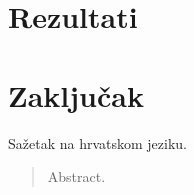 \documentclass[times, utf8, zavrsni]{fer}
\begin{document}
\chapter{Rezultati}


\chapter{Zaključak}





\begin{sazetak}
Sažetak na hrvatskom jeziku.

\end{sazetak}

\begin{abstract}
Abstract.

\end{abstract}
\end{document}
